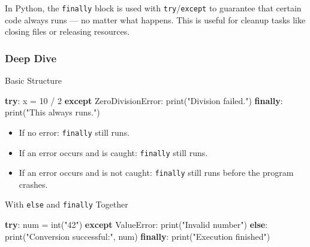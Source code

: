 \documentclass[
  letterpaper,
  DIV=11,
  numbers=noendperiod]{scrreprt}
\newenvironment{Shaded}{\begin{snugshade}}{\end{snugshade}}
\newcommand{\BuiltInTok}[1]{\textcolor[rgb]{0.00,0.23,0.31}{#1}}
\newcommand{\ControlFlowTok}[1]{\textcolor[rgb]{0.00,0.23,0.31}{\textbf{#1}}}
\newcommand{\DecValTok}[1]{\textcolor[rgb]{0.68,0.00,0.00}{#1}}
\newcommand{\NormalTok}[1]{\textcolor[rgb]{0.00,0.23,0.31}{#1}}
\newcommand{\OperatorTok}[1]{\textcolor[rgb]{0.37,0.37,0.37}{#1}}
\newcommand{\PreprocessorTok}[1]{\textcolor[rgb]{0.68,0.00,0.00}{#1}}
\newcommand{\StringTok}[1]{\textcolor[rgb]{0.13,0.47,0.30}{#1}}
\providecommand{\tightlist}{%
  \setlength{\itemsep}{0pt}\setlength{\parskip}{0pt}}
\begin{document}
In Python, the \texttt{finally} block is used with
\texttt{try}/\texttt{except} to guarantee that certain code always runs
--- no matter what happens. This is useful for cleanup tasks like
closing files or releasing resources.

\subsubsection{Deep Dive}\label{deep-dive-75}

Basic Structure

\begin{Shaded}
\begin{Highlighting}[]
\ControlFlowTok{try}\NormalTok{:}
\NormalTok{    x }\OperatorTok{=} \DecValTok{10} \OperatorTok{/} \DecValTok{2}
\ControlFlowTok{except} \PreprocessorTok{ZeroDivisionError}\NormalTok{:}
    \BuiltInTok{print}\NormalTok{(}\StringTok{"Division failed."}\NormalTok{)}
\ControlFlowTok{finally}\NormalTok{:}
    \BuiltInTok{print}\NormalTok{(}\StringTok{"This always runs."}\NormalTok{)}
\end{Highlighting}
\end{Shaded}

\begin{itemize}
\tightlist
\item
  If no error: \texttt{finally} still runs.
\item
  If an error occurs and is caught: \texttt{finally} still runs.
\item
  If an error occurs and is not caught: \texttt{finally} still runs
  before the program crashes.
\end{itemize}

With \texttt{else} and \texttt{finally} Together

\begin{Shaded}
\begin{Highlighting}[]
\ControlFlowTok{try}\NormalTok{:}
\NormalTok{    num }\OperatorTok{=} \BuiltInTok{int}\NormalTok{(}\StringTok{"42"}\NormalTok{)}
\ControlFlowTok{except} \PreprocessorTok{ValueError}\NormalTok{:}
    \BuiltInTok{print}\NormalTok{(}\StringTok{"Invalid number"}\NormalTok{)}
\ControlFlowTok{else}\NormalTok{:}
    \BuiltInTok{print}\NormalTok{(}\StringTok{"Conversion successful:"}\NormalTok{, num)}
\ControlFlowTok{finally}\NormalTok{:}
    \BuiltInTok{print}\NormalTok{(}\StringTok{"Execution finished"}\NormalTok{)}
\end{Highlighting}
\end{Shaded}
\end{document}
